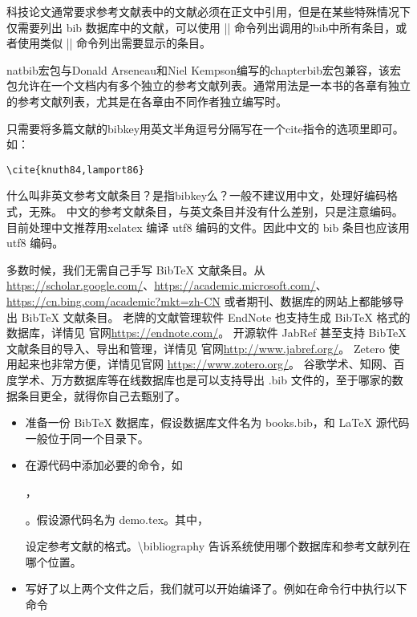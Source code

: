 科技论文通常要求参考文献表中的文献必须在正文中引用，但是在某些特殊情况下仅需要列出
bib 数据库中的文献，可以使用 |\nocite{*}|
命令列出调用的bib中所有条目，或者使用类似 |\nocite{ref1,ref2,ref3}| 命令列出需要显示的条目。







natbib宏包与Donald Arseneau和Niel
Kempson编写的chapterbib宏包兼容，该宏包允许在一个文档内有多个独立的参考文献列表。通常用法是一本书的各章有独立的参考文献列表，尤其是在各章由不同作者独立编写时。



只需要将多篇文献的bibkey用英文半角逗号分隔写在一个cite指令的选项里即可。如：

\begin{verbatim}
\cite{knuth84,lamport86}
\end{verbatim}



什么叫非英文参考文献条目？是指bibkey么？一般不建议用中文，处理好编码格式，无殊。
中文的参考文献条目，与英文条目并没有什么差别，只是注意编码。目前处理中文推荐用xelatex
编译 utf8 编码的文件。因此中文的 bib 条目也应该用 utf8 编码。



多数时候，我们无需自己手写 BibTeX 文献条目。从
\url{https://scholar.google.com/}、\url{https://academic.microsoft.com/}、
\url{https://cn.bing.com/academic?mkt=zh-CN}
或者期刊、数据库的网站上都能够导出 BibTeX 文献条目。 老牌的文献管理软件
EndNote 也支持生成 BibTeX 格式的数据库，详情见
官网\url{https://endnote.com/}。 开源软件 JabRef 甚至支持 BibTeX
文献条目的导入、导出和管理，详情见 官网\url{http://www.jabref.org/}。
Zetero 使用起来也非常方便，详情见官网 \url{https://www.zotero.org/}。
谷歌学术、知网、百度学术、万方数据库等在线数据库也是可以支持导出 .bib
文件的，至于哪家的数据条目更全，就得你自己去甄别了。



\begin{itemize}

\item
  准备一份 BibTeX 数据库，假设数据库文件名为 books.bib，和 LaTeX
  源代码一般位于同一个目录下。
\item
  在源代码中添加必要的命令，如

  

  ，

  

  。假设源代码名为 demo.tex。其中，


  设定参考文献的格式。\textbackslash{}bibliography
  告诉系统使用哪个数据库和参考文献列在哪个位置。
\item
  写好了以上两个文件之后，我们就可以开始编译了。例如在命令行中执行以下命令
\end{itemize}

